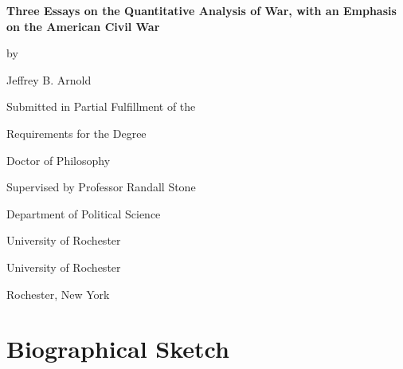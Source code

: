 \documentclass[12pt,oneside]{book}
\begin{document}
\begin{titlepage}
  \vspace*{\fill}

  \begin{center}
    {\LARGE \bfseries
      Three Essays on the Quantitative Analysis of War,
      with an Emphasis on the American Civil War
      \par
    }

    \bigskip%
    by

    \bigskip%
    Jeffrey B. Arnold


    \bigskip\bigskip\bigskip\bigskip%
    Submitted in Partial Fulfillment of the

    \bigskip%
    Requirements for the Degree

    \bigskip%
    Doctor of Philosophy


    \bigskip\bigskip\bigskip\bigskip%
    Supervised by Professor Randall Stone

    \bigskip\bigskip%
    Department of Political Science

    \bigskip%
    University of Rochester


    \bigskip\bigskip\bigskip\bigskip%
    University of Rochester

    \bigskip%
    Rochester, New York


    \bigskip\bigskip\bigskip{}
  \end{center}

  \vspace*{\fill}
\end{titlepage}



\pagestyle{fancy}
\setcounter{page}{2}
\doublespacing


\thispagestyle{plain}
\begin{center}
  \vspace*{\fill}
  \it%
  
  \vspace*{\fill}
\end{center}

\clearpage


\chapter*{Biographical Sketch}

\end{document}
